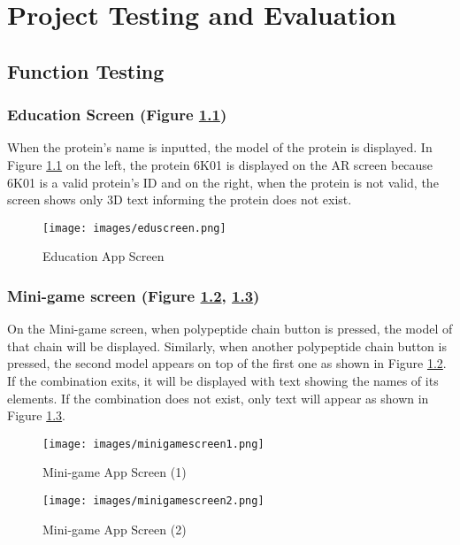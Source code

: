 \chapter{Project Testing and Evaluation}
\label{ch:evaluation}

\section{Function Testing}
\subsection{Education Screen (Figure \ref{fig:eduscreen})}
When the protein's name is inputted, the model of the protein is displayed.
In Figure \ref{fig:eduscreen} on the left, the protein 6K01 is displayed on the AR screen because 6K01 is a valid protein's ID and on the right, when the protein is not valid, the screen shows only 3D text informing the protein does not exist.
 \begin{figure}[!htp]
	\centering
	\texttt{[image: images/eduscreen.png]}
	\caption{Education App Screen}
	\label{fig:eduscreen}
\end{figure}

\subsection{Mini-game screen (Figure \ref{fig:minigamescreen1}, \ref{fig:minigamescreen2})}
On the Mini-game screen, when polypeptide chain button is pressed, the model of that chain will be displayed. Similarly, when another polypeptide chain button is pressed, the second model appears on top of the first one as shown in Figure \ref{fig:minigamescreen1}. If the combination exits, it will be displayed with text showing the names of its elements. If the combination does not exist, only text will appear as shown in Figure \ref{fig:minigamescreen2}.
 \begin{figure}[!htp]
	\centering
	\texttt{[image: images/minigamescreen1.png]}
	\caption{Mini-game App Screen (1)}
	\label{fig:minigamescreen1}
\end{figure}

 \begin{figure}[!htp]
	\centering
	\texttt{[image: images/minigamescreen2.png]}
	\caption{Mini-game App Screen (2)}
	\label{fig:minigamescreen2}
\end{figure}

